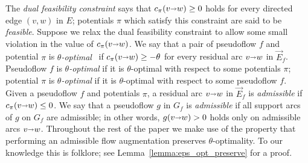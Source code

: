 \documentclass[a4paper,UKenglish]{socg-lipics-v2018}
\makeatletter
\def\eps{\varepsilon}
\def\arcto{\mathord\shortrightarrow}
\def\arc#1#2{#1\arcto#2}
\theoremstyle{plain}
\numberwithin{figure}{section}
\def\EMPH#1{\textcolor{BrickRed}{{\emph{#1}}}}
\def\n@te#1{\textsf{\boldmath \textbf{$\langle\!\langle$#1$\rangle\!\rangle$}}\leavevmode}
\def\note#1{\textcolor{red}{\n@te{#1}}}
\makeatother
\begin{document}
The \EMPH{dual feasibility constraint} says that $c_\pi(\arc vw) \geq 0$ holds for every directed edge $(v,w)$ in $E$; potentials $\pi$ which satisfy this constraint are said to be \EMPH{feasible}.
%
%
Suppose we relax the dual feasibility constraint to allow some small violation in the value of $c_\pi(\arc vw)$.
We say that a pair of pseudoflow $f$ and potential $\pi$ is
\EMPH{$\theta$-optimal}~\cite{T85,BE87}%
if $c_\pi(\arc vw) \geq -\theta$ for every residual arc $\arc vw$ in $\vec{E}_f$.
Pseudoflow $f$ is \emph{$\theta$-optimal} if it is $\theta$-optimal with respect to
some potentials $\pi$; potential $\pi$ is \emph{$\theta$-optimal} if it is
$\theta$-optimal with respect to some pseudoflow $f$.
%
Given a pseudoflow $f$ and potentials $\pi$, a residual arc $\arc vw$ in $\vec{E}_f$ is
\EMPH{admissible} if $c_\pi(\arc vw) \leq 0$.
We say that a pseudoflow $g$ in $G_f$ is \EMPH{admissible} if all support arcs of $g$ on $G_f$ are admissible; in other words, $g(\arc vw) > 0$ holds only on admissible arcs $\arc vw$.
%
Throughout the rest of the paper we make use of the property that performing
an admissible flow augmentation preserves $\theta$-optimality.
To our knowledge this is folklore;
see Lemma~\ref{lemma:eps_opt_preserve} for a proof.
\end{document}
